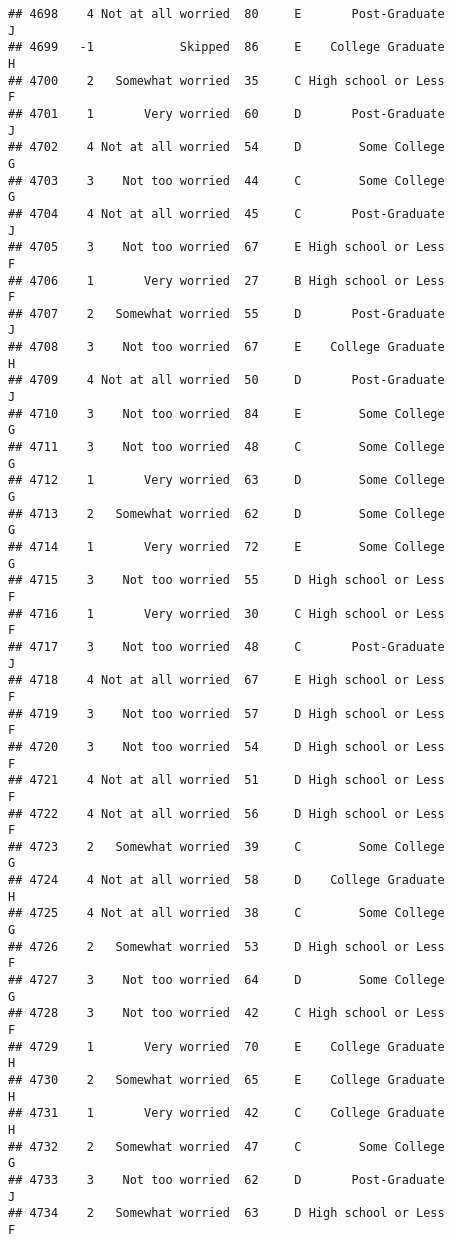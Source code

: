 \documentclass[
]{article}
\begin{document}
\begin{verbatim}
## 4698    4 Not at all worried  80     E       Post-Graduate         J
## 4699   -1            Skipped  86     E    College Graduate         H
## 4700    2   Somewhat worried  35     C High school or Less         F
## 4701    1       Very worried  60     D       Post-Graduate         J
## 4702    4 Not at all worried  54     D        Some College         G
## 4703    3    Not too worried  44     C        Some College         G
## 4704    4 Not at all worried  45     C       Post-Graduate         J
## 4705    3    Not too worried  67     E High school or Less         F
## 4706    1       Very worried  27     B High school or Less         F
## 4707    2   Somewhat worried  55     D       Post-Graduate         J
## 4708    3    Not too worried  67     E    College Graduate         H
## 4709    4 Not at all worried  50     D       Post-Graduate         J
## 4710    3    Not too worried  84     E        Some College         G
## 4711    3    Not too worried  48     C        Some College         G
## 4712    1       Very worried  63     D        Some College         G
## 4713    2   Somewhat worried  62     D        Some College         G
## 4714    1       Very worried  72     E        Some College         G
## 4715    3    Not too worried  55     D High school or Less         F
## 4716    1       Very worried  30     C High school or Less         F
## 4717    3    Not too worried  48     C       Post-Graduate         J
## 4718    4 Not at all worried  67     E High school or Less         F
## 4719    3    Not too worried  57     D High school or Less         F
## 4720    3    Not too worried  54     D High school or Less         F
## 4721    4 Not at all worried  51     D High school or Less         F
## 4722    4 Not at all worried  56     D High school or Less         F
## 4723    2   Somewhat worried  39     C        Some College         G
## 4724    4 Not at all worried  58     D    College Graduate         H
## 4725    4 Not at all worried  38     C        Some College         G
## 4726    2   Somewhat worried  53     D High school or Less         F
## 4727    3    Not too worried  64     D        Some College         G
## 4728    3    Not too worried  42     C High school or Less         F
## 4729    1       Very worried  70     E    College Graduate         H
## 4730    2   Somewhat worried  65     E    College Graduate         H
## 4731    1       Very worried  42     C    College Graduate         H
## 4732    2   Somewhat worried  47     C        Some College         G
## 4733    3    Not too worried  62     D       Post-Graduate         J
## 4734    2   Somewhat worried  63     D High school or Less         F

\end{verbatim}
\end{document}
